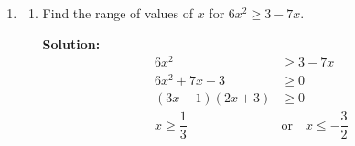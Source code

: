 \documentclass{report}
\newcommand{\sol}{\textbf{Solution:}}
\begin{document}
\begin{enumerate}[leftmargin=*]
\begin{enumerate}
              \item Given the quadratic function $h(x)=x^2-12 x+3 p$, where $p$ is a constant.
                    \begin{enumerate}
                        \item Express $h(x)$ in the form $h(x)=(x+m)^2+n$, such that $m$ and $n$ are
                              constants.

                              \sol{}
                              \begin{align*}
                                  h(x) & = x^2-12 x+3 p         \\
                                       & = (x^2-12 x+36)-36+3 p \\
                                       & = (x-6)^2+3 p-36
                              \end{align*}

                        \item Given that the minimum value of $h(x)$ is -15 , find the value of $p$.

                              \sol{}
                              \begin{align*}
                                  h(x) & = (x-6)^2+3 p-36 \\
                                  -15  & = 3 p-36         \\
                                  3 p  & = 36-15          \\
                                  3 p  & = 21             \\
                                  p    & = 7
                              \end{align*}
                    \end{enumerate}
          \end{enumerate}

    \item \begin{enumerate}
              \item Find the range of values of $x$ for $6 x^2 \geqslant 3-7 x$.

                    \sol{}
                    \begin{align*}
                        6 x^2                                       & \geqslant 3-7 x                           \\
                        6 x^2+7 x-3                                 & \geqslant 0                               \\
                        (3 x-1)(2 x+3)                              & \geqslant 0                               \\
                        x              \geqslant \dfrac{1}{3} \quad & \text{or} \quad x \leqslant -\dfrac{3}{2}
                    \end{align*}


\end{enumerate}
\end{enumerate}
\end{document}
